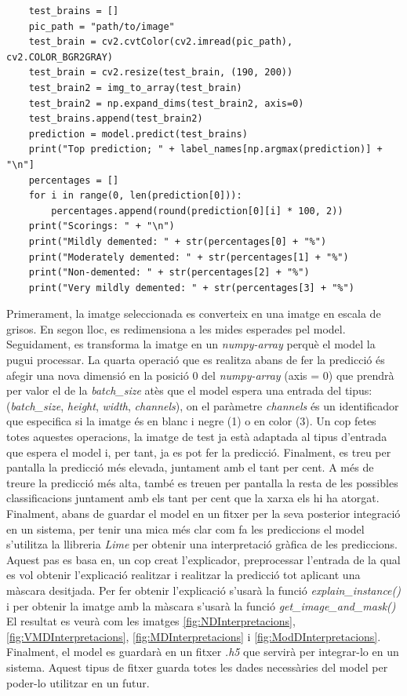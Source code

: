 \documentclass[a4paper,12pt]{report}
\begin{document}
\begin{lstlisting}
    test_brains = []
    pic_path = "path/to/image"
    test_brain = cv2.cvtColor(cv2.imread(pic_path), cv2.COLOR_BGR2GRAY)
    test_brain = cv2.resize(test_brain, (190, 200))
    test_brain2 = img_to_array(test_brain)
    test_brain2 = np.expand_dims(test_brain2, axis=0)
    test_brains.append(test_brain2)
    prediction = model.predict(test_brains)
    print("Top prediction; " + label_names[np.argmax(prediction)] + "\n"]
    percentages = []
    for i in range(0, len(prediction[0])):
        percentages.append(round(prediction[0][i] * 100, 2))
    print("Scorings: " + "\n")
    print("Mildly demented: " + str(percentages[0] + "%")
    print("Moderately demented: " + str(percentages[1] + "%")
    print("Non-demented: " + str(percentages[2] + "%")
    print("Very mildly demented: " + str(percentages[3] + "%")
\end{lstlisting}
Primerament, la imatge seleccionada es converteix en una imatge en escala de grisos. En segon lloc, es redimensiona a les mides esperades pel model. Seguidament, es transforma la imatge en un \textit{numpy-array} perquè el model la pugui processar. La quarta operació que es realitza abans de fer la predicció és afegir una nova dimensió en la posició 0 del \textit{numpy-array} (axis = 0) que prendrà per valor el de la \textit{batch\_size} atès que el model espera una entrada del tipus: (\textit{batch\_size}, \textit{height}, \textit{width}, \textit{channels}), on el paràmetre \textit{channels} és un identificador que especifica si la imatge és en blanc i negre (1) o en color (3). Un cop fetes totes aquestes operacions, la imatge de test ja està adaptada al tipus d'entrada que espera el model i, per tant, ja es pot fer la predicció. Finalment, es treu per pantalla la predicció més elevada, juntament amb el tant per cent. A més de treure la predicció més alta, també es treuen per pantalla la resta de les possibles classificacions juntament amb els tant per cent que la xarxa els hi ha atorgat.
Finalment, abans de guardar el model en un fitxer per la seva posterior integració en un sistema, per tenir una mica més clar com fa les prediccions el model s'utilitza la llibreria \textit{Lime} per obtenir una interpretació gràfica de les prediccions.\\
Aquest pas es basa en, un cop creat l'explicador, preprocessar l'entrada de la qual es vol obtenir l'explicació realitzar i realitzar la predicció tot aplicant una màscara desitjada. Per fer obtenir l'explicació s'usarà la funció \textit{explain\_instance()} i per obtenir la imatge amb la màscara s'usarà la funció \textit{get\_image\_and\_mask()} El resultat es veurà com les imatges \ref{fig:NDInterpretacions}, \ref{fig:VMDInterpretacions}, \ref{fig:MDInterpretacions} i \ref{fig:ModDInterpretacions}.\\
\newline
Finalment, el model es guardarà en un fitxer \textit{.h5} que servirà per integrar-lo en un sistema. Aquest tipus de fitxer guarda totes les dades necessàries del model per poder-lo utilitzar en un futur.
\end{document}
